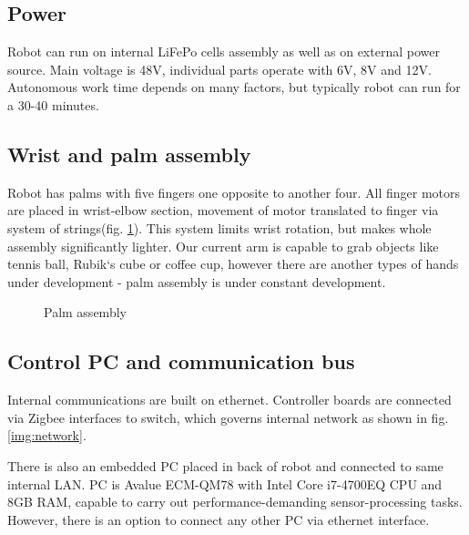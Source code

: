 \documentclass[letterpaper, 10 pt, conference]{ieeeconf}  %
\begin{document}
\subsection{Power}
Robot can run on internal LiFePo cells assembly as well as on external power
source. Main voltage is 48V, individual parts operate with 6V, 8V and 12V.
Autonomous work time depends on many factors, but typically robot can run for a
30-40 minutes.
 
\subsection{Wrist and palm assembly}
Robot has palms with five fingers one opposite to another four. All
finger motors are placed in wrist-elbow section, movement of motor translated to finger
via system of strings(fig. \ref{img:wrist}). This system limits wrist rotation,
but makes whole assembly significantly lighter. Our current arm is capable to grab objects like
tennis ball, Rubik`s cube or coffee cup, however there are
another types of hands under development - palm assembly is under
constant development.

\begin{figure}[thpb]
\caption{Palm assembly}
\label{img:wrist}
\end{figure}  

\subsection{Control PC and communication bus}

Internal communications are built on ethernet. Controller boards are connected
via Zigbee interfaces to switch, which governs internal network as shown
in fig. \ref{img:network}.

There is also an embedded PC placed in back of robot and connected to same internal LAN. PC is
Avalue ECM-QM78 with Intel Core i7-4700EQ CPU and 8GB RAM, capable to carry out
performance-demanding sensor-processing tasks. However, there is an option to
connect any other PC via ethernet interface.
\end{document}
